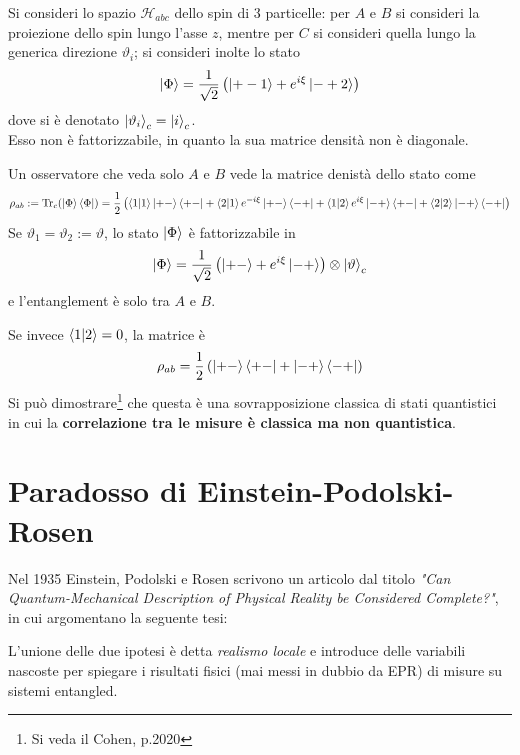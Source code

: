 Si consideri lo spazio $\mathcal{H}_{abc}$ dello spin di 3 particelle: per $A$ e $B$ si consideri
la proiezione dello spin lungo l'asse $z$, mentre per $C$ si consideri quella lungo la generica
direzione $\vartheta_i$; si consideri inolte lo stato
$$\ket{\Phi}=\frac{1}{\sqrt{2}}\left(\ket{+-1}+e^{i\xi}\ket{-+2}\right)$$
dove si è denotato $\ket{\vartheta_i}_c=\ket{i}_c$.\\
Esso non è fattorizzabile, in quanto la sua matrice densità non è diagonale.

Un osservatore che veda solo $A$ e $B$ vede la matrice denistà dello stato come
$$\rho_{ab}:=\Tr_c(\ket{\Phi}\bra{\Phi})=\frac12\left(\bra{1}\ket{1}\ket{+-}\bra{+-}
+\bra{2}\ket{1}e^{-i\xi}\ket{+-}\bra{-+}+\bra{1}\ket{2}
e^{i\xi}\ket{-+}\bra{+-}+\bra{2}\ket{2}\ket{-+}\bra{-+}\right)$$
Se $\vartheta_1=\vartheta_2:=\vartheta$, lo stato $\ket{\Phi}$ è fattorizzabile in
$$\ket{\Phi}=\frac{1}{\sqrt{2}}\left(\ket{+-}+e^{i\xi}\ket{-+}\right)\otimes\ket{\vartheta}_c$$
e l'entanglement è solo tra $A$ e $B$.

Se invece $\bra{1}\ket{2}=0$, la matrice è
$$\rho_{ab}=\frac{1}{2}\left(\ket{+-}\bra{+-}+\ket{-+}\bra{-+}\right)$$
Si può dimostrare\footnote{Si veda il Cohen, p.2020} che questa è una sovrapposizione classica
di stati quantistici in cui la \textbf{correlazione tra le misure è classica ma non quantistica}.
\section{Paradosso di Einstein-Podolski-Rosen}
Nel 1935 Einstein, Podolski e Rosen scrivono un articolo dal titolo
\textit{"Can Quantum-Mechanical Description of Physical Reality be Considered Complete?"}, in cui
argomentano la seguente tesi:

\noindent{}

L'unione delle due ipotesi è detta \textit{realismo locale} e introduce delle variabili nascoste per
spiegare i risultati fisici (mai messi in dubbio da EPR) di misure su sistemi entangled.
